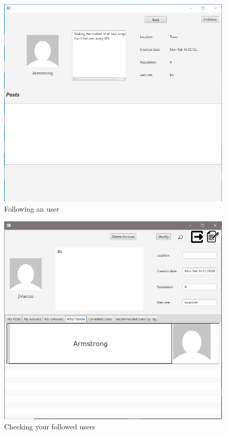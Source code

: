 \documentclass[11pt]{report}
\begin{document}
\begin{figure}[H]
  \centering
  \includegraphics[width=\textwidth,keepaspectratio=true]{img/user_manual/SeguireUtente2.png}
  \caption{Following an user}
  \label{fig:SeguireUtente2}
\end{figure}
\begin{figure}[H]
  \centering
  \includegraphics[width=\textwidth,keepaspectratio=true]{img/user_manual/SeguireUtente3.png}
  \caption{Checking your followed users}
  \label{fig:SeguireUtente3}
\end{figure}
\end{document}
